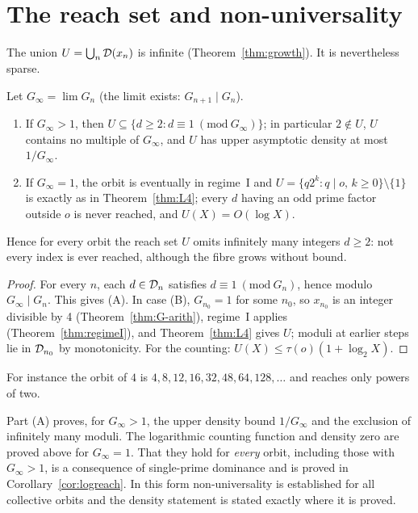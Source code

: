 \section{The reach set and non-universality}

The union \(U=\bigcup_n\mathcal{D}(x_n)\) is infinite (Theorem~\ref{thm:growth}). It is nevertheless sparse.

\begin{theorem}\label{thm:nonuniv}
Let \(G_\infty=\lim G_n\) (the limit exists: \(G_{n+1}\mid G_n\)).
\begin{enumerate}[label=(\Alph*),nosep]
\item If \(G_\infty>1\), then \(U\subseteq\{d\ge2:d\equiv1\ (\mathrm{mod}\ G_\infty)\}\); in particular \(2\notin U\), \(U\) contains no multiple of \(G_\infty\), and \(U\) has upper asymptotic density at most \(1/G_\infty\).
\item If \(G_\infty=1\), the orbit is eventually in regime~I and \(U=\{q2^k:q\mid o,\,k\ge0\}\setminus\{1\}\) is exactly as in Theorem~\ref{thm:L4}; every \(d\) having an odd prime factor outside \(o\) is never reached, and \(U(X)=O(\log X)\).
\end{enumerate}
Hence for every orbit the reach set \(U\) omits infinitely many integers \(d\ge2\): not every index is ever reached, although the fibre grows without bound.
\end{theorem}
\begin{proof}
For every \(n\), each \(d\in\mathcal{D}_n\) satisfies \(d\equiv1\ (\mathrm{mod}\ G_n)\), hence modulo \(G_\infty\mid G_n\). This gives (A). In case (B), \(G_{n_0}=1\) for some \(n_0\), so \(x_{n_0}\) is an integer divisible by 4 (Theorem~\ref{thm:G-arith}), regime~I applies (Theorem~\ref{thm:regimeI}), and Theorem~\ref{thm:L4} gives \(U\); moduli at earlier steps lie in \(\mathcal{D}_{n_0}\) by monotonicity. For the counting: \(U(X)\le\tau(o)(1+\log_2X)\).
\end{proof}

For instance the orbit of \(4\) is \(4,8,12,16,32,48,64,128,\dots\) and reaches only powers of two.

\begin{remark}\label{rem:L5}
Part (A) proves, for \(G_\infty>1\), the upper density bound \(1/G_\infty\) and the exclusion of infinitely many moduli. The logarithmic counting function and density zero are proved above for \(G_\infty=1\). That they hold for \emph{every} orbit, including those with \(G_\infty>1\), is a consequence of single-prime dominance and is proved in Corollary~\ref{cor:logreach}. In this form non-universality is established for all collective orbits and the density statement is stated exactly where it is proved.
\end{remark}
